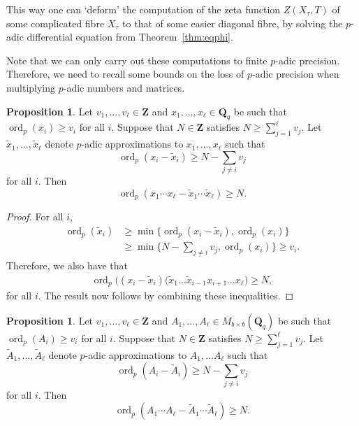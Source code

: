 \documentclass[a4paper,11pt]{article}
\numberwithin{equation}{section}
\newcommand{\ZZ}{\mathbf{Z}} %
\newcommand{\QQ}{\mathbf{Q}} %
\DeclareMathOperator{\ord}{ord}          %
\theoremstyle{definition}
\newtheorem{prop}[thm]{Proposition}
\begin{document}
This way one can `deform' the computation of the zeta function $Z(X_{\tau},T)$ of some complicated fibre $X_{\tau}$
to that of some easier diagonal fibre, by solving the $p$-adic differential equation from Theorem~\ref{thm:eqphi}.

Note that we can only carry out these computations to finite $p$-adic precision. Therefore, we need to recall 
some bounds on the loss of $p$-adic precision when multiplying $p$-adic numbers and matrices. 

\begin{prop} \label{prop:productval}
Let $v_1,\ldots,v_{\ell} \in \ZZ$ and $x_1, \dotsc, x_{\ell} \in \mathbf{Q}_q$  
be such that $\ord_p(x_i) \geq v_i$ for all $i$. Suppose that $N \in \ZZ$ satisfies 
$N \geq \sum_{j=1}^{\ell} v_j$. Let $\tilde{x}_1, \dotsc, \tilde{x}_{\ell}$ denote 
$p$-adic approximations to $x_1, \dotsc, x_{\ell}$ such that 
\[
\ord_p(x_i - \tilde{x}_i) \geq N - \sum_{j \neq i} v_j
\] 
for all $i$.  Then 
\begin{equation*}
\ord_p(x_1 \dotsm x_{\ell} - \tilde{x}_1 \dotsm \tilde{x}_{\ell}) \geq N.
\end{equation*}
\end{prop}

\begin{proof}
For all $i$,
\begin{align*}
\ord_p(\tilde{x}_i) &\geq \min \{ \ord_p(x_i-\tilde{x}_i), \ord_p(x_i) \} \\
                    &\geq \min \{ N- \sum_{j \neq i} v_j, \ord_p(x_i)\} \geq v_i.
\end{align*}
Therefore, we also have that
\begin{align*}
\ord_p \bigl( (x_{i}-\tilde{x}_{i})(\tilde{x}_1 \dotsc \tilde{x}_{i-1} x_{i+1} \dotsc x_{\ell} \bigr) \geq N,
\end{align*}
for all $i$. The result now follows by combining these inequalities.
\end{proof}

\begin{prop} \label{prop:matrixproductval}
Let $v_1,\ldots,v_{\ell} \in \ZZ$ and $A_1, \dotsc, A_{\ell} \in M_{b \times b}(\QQ_q)$
be such that $\ord_p(A_i) \geq v_i$ for all $i$. Suppose that $N \in \ZZ$ satisfies 
$N \geq \sum_{j=1}^{\ell} v_j$.
Let $\tilde{A}_1, \dotsc, \tilde{A}_{\ell}$ denote $p$-adic approximations 
to $A_1, \dotsc A_{\ell}$ such that
\[
\ord_p(A_i - \tilde{A}_i) \geq N - \sum_{j \neq i} v_j
\]
for all $i$.  Then 
\begin{equation}
\ord_p(A_1 \dotsm A_{\ell} - \tilde{A}_1 \dotsm \tilde{A}_{\ell}) \geq N.
\end{equation}
\end{prop}
\end{document}
